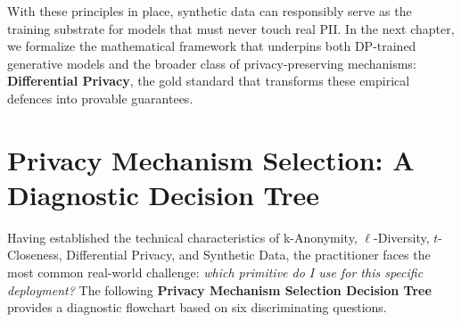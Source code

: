With these principles in place, synthetic data can responsibly serve
as the training substrate for models that must never touch real PII.
In the next chapter, we formalize the mathematical framework that
underpins both DP-trained generative models and the broader class of
privacy-preserving mechanisms: \textbf{Differential Privacy}, the
gold standard that transforms these empirical defences into provable
guarantees.

\section{Privacy Mechanism Selection: A Diagnostic Decision Tree}
\label{sec:privacy_mechanism_selection}

Having established the technical characteristics of k-Anonymity, $\ell$-Diversity, $t$-Closeness, Differential Privacy, and Synthetic Data, the practitioner faces the most common real-world challenge: \emph{which primitive do I use for this specific deployment?} The following \textbf{Privacy Mechanism Selection Decision Tree} provides a diagnostic flowchart based on six discriminating questions.

